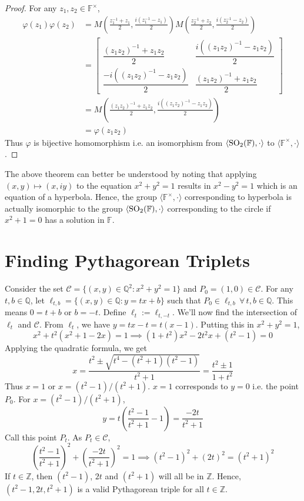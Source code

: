 \begin{proof}
    \noindent
    For any $z_1,z_2\in\mathbb{F}^\times$,
    \begin{align*}
        \varphi(z_1)\varphi(z_2) &= M\left(\frac{z_1^{-1}+z_1}{2},\frac{i(z_1^{-1}-z_1)}{2}\right)M\left(\frac{z_2^{-1}+z_2}{2},\frac{i(z_2^{-1}-z_2)}{2}\right) \\
                                 &= \begin{bmatrix}
                                        \dfrac{(z_1 z_2)^{-1} + z_1 z_2}{2} &
                                        \dfrac{i((z_1 z_2)^{-1} - z_1 z_2)}{2} \\
                                        \dfrac{-i((z_1 z_2)^{-1} - z_1 z_2)}{2} &
                                        \dfrac{(z_1 z_2)^{-1} + z_1 z_2}{2}
                                    \end{bmatrix} \\
                                 &= M\left(\frac{(z_1 z_2)^{-1} + z_1 z_2}{2},\frac{i((z_1 z_2)^{-1} - z_1 z_2)}{2}\right) \\
                                 &= \varphi(z_1 z_2)
    \end{align*}
    Thus $\varphi$ is bijective homomorphism i.e. an isomorphism from
    $\langle\mathrm{SO}_{2}(\mathbb{F}),\cdot\rangle$ to $\langle\mathbb{F}^\times,\cdot\rangle$.
\end{proof}

The above theorem can better be understood by noting that applying
$(x,y)\mapsto(x,iy)$ to the equation $x^2+y^2=1$ results in $x^2-y^2=1$ which is
an equation of a hyperbola. Hence, the group
$\langle\mathbb{F}^\times,\cdot\rangle$ corresponding to hyperbola is actually
isomorphic to the group $\langle\mathrm{SO}_{2}(\mathbb{F}),\cdot\rangle$ corresponding to the circle
if $x^2+1=0$ has a solution in $\mathbb{F}$.

\section{Finding Pythagorean Triplets}

Consider the set $\mathcal{C} = \{(x,y)\in\mathbb{Q}^2: x^2 + y^2 = 1\}$ and
$P_0 = (1,0)\in\mathcal{C}$. For any $t,b\in\mathbb{Q}$, let
$\ell_{t,b}=\{(x,y)\in\mathbb{Q}:y=tx+b\}$ such that
$P_0\in\ell_{t,b}\,\forall\,t,b\in\mathbb{Q}$. This means $0 = t + b$ or $b = -t$.
Define $\ell_t:=\ell_{t,-t}$. We'll now find the intersection of $\ell_t$ and
$\mathcal{C}$. From $\ell_t$, we have $y = tx - t = t(x - 1)$. Putting this in
$x^2 + y^2 = 1$,
\[ x^2 + t^2(x^2 + 1 - 2x) = 1 \implies (1+t^2)x^2 - 2 t^2 x + (t^2 - 1) = 0 \]
Applying the quadratic formula, we get
\[
    x = \frac{t^2 \pm \sqrt{t^4 - (t^2+1)(t^2-1)}}{t^2+1}
    = \frac{t^2 \pm 1}{1 + t^2}
\]
Thus $x = 1$ or $x = (t^2-1)/(t^2+1)$. $x=1$ corresponds to $y=0$ i.e. the point
$P_0$. For $x = (t^2-1)/(t^2+1)$,
\[ y = t\left(\frac{t^2-1}{t^2+1}-1\right) = \frac{-2t}{t^2+1} \]
Call this point $P_t$. As $P_t\in\mathcal{C}$,
\[
    \left(\frac{t^2-1}{t^2+1}\right)^2 + \left(\frac{-2t}{t^2+1}\right)^2 = 1
    \implies (t^2-1)^2 + (2t)^2 = (t^2+1)^2
\]
If $t\in\mathbb{Z}$, then $(t^2-1)$, $2t$ and $(t^2+1)$ will all be in
$\mathbb{Z}$. Hence, $(t^2-1, 2t, t^2+1)$ is a valid Pythagorean triple
for all $t\in\mathbb{Z}$.

